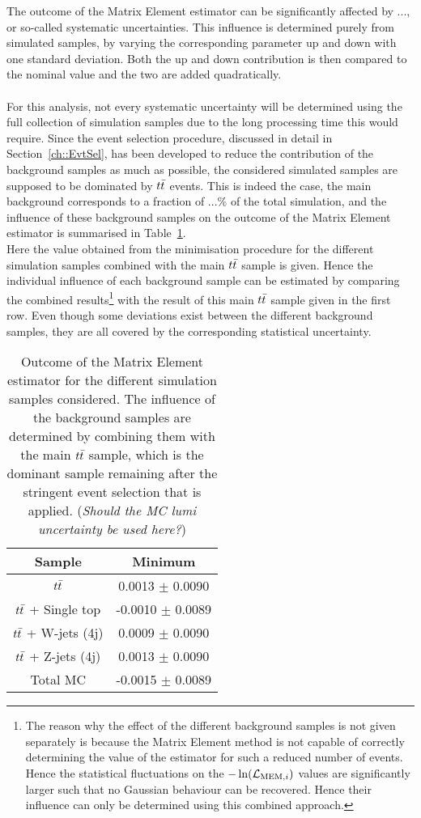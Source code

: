 The outcome of the Matrix Element estimator can be significantly affected by ..., or so-called systematic uncertainties.
This influence is determined purely from simulated samples, by varying the corresponding parameter up and down with one standard deviation.
Both the up and down contribution is then compared to the nominal value and the two are added quadratically.
\\
\\
For this analysis, not every systematic uncertainty will be determined using the full collection of simulation samples due to the long processing time this would require.
Since the event selection procedure, discussed in detail in Section~\ref{ch::EvtSel}, has been developed to reduce the contribution of the background samples as much as possible, the considered simulated samples are supposed to be dominated by $t\bar{t}$ events.
This is indeed the case, the main background corresponds to a fraction of $...\%$ of the total simulation, and the influence of these background samples on the outcome of the Matrix Element estimator is summarised in Table~\ref{table::BckInfl}.
\\
Here the value obtained from the minimisation procedure for the different simulation samples combined with the main $t\bar{t}$ sample is given. Hence the individual influence of each background sample can be estimated by comparing the combined results\footnote{The reason why the effect of the different background samples is not given separately is because the Matrix Element method is not capable of correctly determining the value of the estimator for such a reduced number of events. Hence the statistical fluctuations on the $-\ln(\mathcal{L}_{\textrm{MEM}, i})$ values are significantly larger such that no Gaussian behaviour can be recovered. Hence their influence can only be determined using this combined approach.} with the result of this main $t\bar{t}$ sample given in the first row.
Even though some deviations exist between the different background samples, they are all covered by the corresponding statistical uncertainty.
\\
\begin{table}[h!t]
 \centering
 \caption{Outcome of the Matrix Element estimator for the different simulation samples considered. The influence of the background samples are determined by combining them with the main $t\bar{t}$ sample, which is the dominant sample remaining after the stringent event selection that is applied. (\textit{Should the MC lumi uncertainty be used here?})} \label{table::BckInfl}
 \renewcommand{\arraystretch}{1.2}
 \begin{tabular}{c|c}
  Sample 			& Minimum 			\\
  \hline
  $t\bar{t}$ 			&  0.0013 $\pm$ 0.0090		\\
  $t\bar{t}$ + Single top 	&  -0.0010 $\pm$ 0.0089		\\
  $t\bar{t}$ + W-jets (4j) 	&  0.0009 $\pm$ 0.0090		\\
  $t\bar{t}$ + Z-jets (4j) 	&  0.0013 $\pm$ 0.0090		\\
  \hline
  Total MC 			& -0.0015 $\pm$ 0.0089 		
 \end{tabular}
\end{table}


